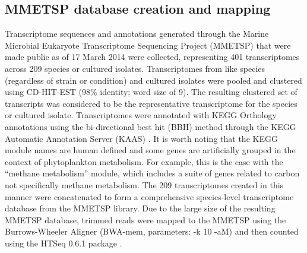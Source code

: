 \subsection{MMETSP database creation and mapping}
Transcriptome sequences and annotations generated through the Marine Microbial Eukaryote Transcriptome Sequencing Project (MMETSP) that were made public as of 17 March 2014 were collected, representing 401 transcriptomes across 209 species or cultured isolates. Transcriptomes from like species (regardless of strain or condition) and cultured isolates were pooled and clustered using CD-HIT-EST (98\% identity; word size of 9). The resulting clustered set of transcripts was considered to be the representative transcriptome for the species or cultured isolate. Transcriptomes were annotated with KEGG Orthology annotations using the bi-directional best hit (BBH) method through the KEGG Automatic Annotation Server (KAAS) \citep{Moriya2007}. It is worth noting that the KEGG module names are human defined and some genes are artificially grouped in the context of phytoplankton metabolism.  For example, this is the case with the ``methane metabolism'' module, which includes a suite of genes related to carbon not specifically methane metabolism. The 209 transcriptomes created in this manner were concatenated to form a comprehensive species-level transcriptome database from the MMETSP library. Due to the large size of the resulting MMETSP database, trimmed reads were mapped to the MMETSP using the Burrows-Wheeler Aligner \citep{Li2010} (BWA-mem, parameters: -k 10 -aM) and then counted using the HTSeq 0.6.1 package \citep{Anders2014}. \par
